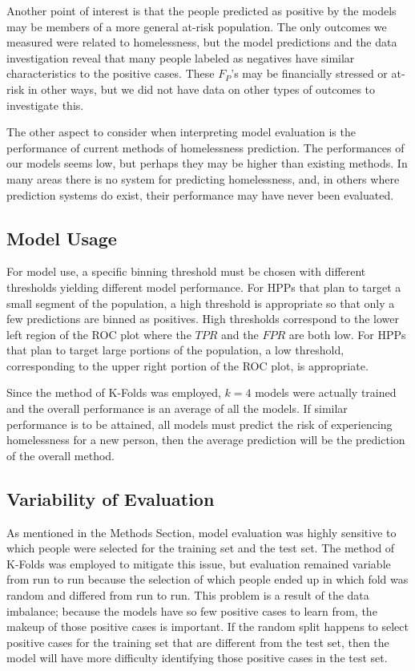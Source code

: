 \documentclass[10pt,letterpaper]{article}
\begin{document}
Another point of interest is that the people predicted as positive by the models may be members of a more general at-risk population. The only outcomes we measured were related to homelessness, but the model predictions and the data investigation reveal that many people labeled as negatives have similar characteristics to the positive cases. These $F_P$'s may be financially stressed or at-risk in other ways, but we did not have data on other types of outcomes to investigate this.

The other aspect to consider when interpreting model evaluation is the performance of current methods of homelessness prediction. The performances of our models seems low, but perhaps they may be higher than existing methods. In many areas there is no system for predicting homelessness, and, in others where prediction systems do exist, their performance may have never been evaluated.

\subsection*{Model Usage}
For model use, a specific binning threshold must be chosen with different thresholds yielding different model performance. For HPPs that plan to target a small segment of the population, a high threshold is appropriate so that only a few predictions are binned as positives. High thresholds correspond to the lower left region of the ROC plot where the $TPR$ and the $FPR$ are both low. For HPPs that plan to target large portions of the population, a low threshold, corresponding to the upper right portion of the ROC plot, is appropriate. 

Since the method of K-Folds was employed, $k=4$ models were actually trained and the overall performance is an average of all the models. If similar performance is to be attained, all models must predict the risk of experiencing homelessness for a new person, then the average prediction will be the prediction of the overall method.

\subsection*{Variability of Evaluation}
As mentioned in the Methods Section, model evaluation was highly sensitive to which people were selected for the training set and the test set. The method of K-Folds was employed to mitigate this issue, but evaluation remained variable from run to run because the selection of which people ended up in which fold was random and differed from run to run. This problem is a result of the data imbalance; because the models have so few positive cases to learn from, the makeup of those positive cases is important. If the random split happens to select positive cases for the training set that are different from the test set, then the model will have more difficulty identifying those positive cases in the test set. 
\end{document}
